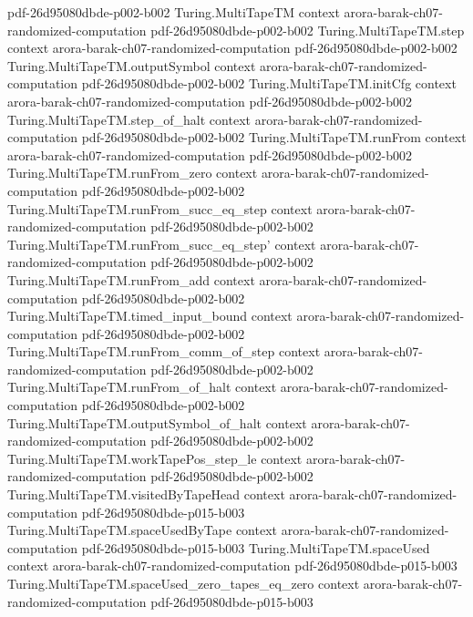 \begin{theorem}
  {pdf-26d95080dbde-p002-b002}
\proofstep
  {Turing.MultiTapeTM}
  {context}
  {arora-barak-ch07-randomized-computation}
  {pdf-26d95080dbde-p002-b002}
\proofstep
  {Turing.MultiTapeTM.step}
  {context}
  {arora-barak-ch07-randomized-computation}
  {pdf-26d95080dbde-p002-b002}
\proofstep
  {Turing.MultiTapeTM.outputSymbol}
  {context}
  {arora-barak-ch07-randomized-computation}
  {pdf-26d95080dbde-p002-b002}
\proofstep
  {Turing.MultiTapeTM.initCfg}
  {context}
  {arora-barak-ch07-randomized-computation}
  {pdf-26d95080dbde-p002-b002}
\proofstep
  {Turing.MultiTapeTM.step_of_halt}
  {context}
  {arora-barak-ch07-randomized-computation}
  {pdf-26d95080dbde-p002-b002}
\proofstep
  {Turing.MultiTapeTM.runFrom}
  {context}
  {arora-barak-ch07-randomized-computation}
  {pdf-26d95080dbde-p002-b002}
\proofstep
  {Turing.MultiTapeTM.runFrom_zero}
  {context}
  {arora-barak-ch07-randomized-computation}
  {pdf-26d95080dbde-p002-b002}
\proofstep
  {Turing.MultiTapeTM.runFrom_succ_eq_step}
  {context}
  {arora-barak-ch07-randomized-computation}
  {pdf-26d95080dbde-p002-b002}
\proofstep
  {Turing.MultiTapeTM.runFrom_succ_eq_step'}
  {context}
  {arora-barak-ch07-randomized-computation}
  {pdf-26d95080dbde-p002-b002}
\proofstep
  {Turing.MultiTapeTM.runFrom_add}
  {context}
  {arora-barak-ch07-randomized-computation}
  {pdf-26d95080dbde-p002-b002}
\proofstep
  {Turing.MultiTapeTM.timed_input_bound}
  {context}
  {arora-barak-ch07-randomized-computation}
  {pdf-26d95080dbde-p002-b002}
\proofstep
  {Turing.MultiTapeTM.runFrom_comm_of_step}
  {context}
  {arora-barak-ch07-randomized-computation}
  {pdf-26d95080dbde-p002-b002}
\proofstep
  {Turing.MultiTapeTM.runFrom_of_halt}
  {context}
  {arora-barak-ch07-randomized-computation}
  {pdf-26d95080dbde-p002-b002}
\proofstep
  {Turing.MultiTapeTM.outputSymbol_of_halt}
  {context}
  {arora-barak-ch07-randomized-computation}
  {pdf-26d95080dbde-p002-b002}
\proofstep
  {Turing.MultiTapeTM.workTapePos_step_le}
  {context}
  {arora-barak-ch07-randomized-computation}
  {pdf-26d95080dbde-p002-b002}
\proofstep
  {Turing.MultiTapeTM.visitedByTapeHead}
  {context}
  {arora-barak-ch07-randomized-computation}
  {pdf-26d95080dbde-p015-b003}
\proofstep
  {Turing.MultiTapeTM.spaceUsedByTape}
  {context}
  {arora-barak-ch07-randomized-computation}
  {pdf-26d95080dbde-p015-b003}
\proofstep
  {Turing.MultiTapeTM.spaceUsed}
  {context}
  {arora-barak-ch07-randomized-computation}
  {pdf-26d95080dbde-p015-b003}
\proofstep
  {Turing.MultiTapeTM.spaceUsed_zero_tapes_eq_zero}
  {context}
  {arora-barak-ch07-randomized-computation}
  {pdf-26d95080dbde-p015-b003}

\end{theorem}
